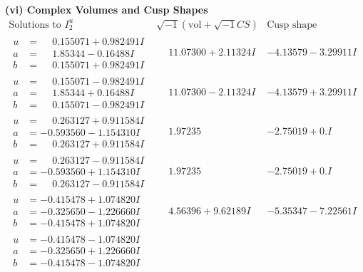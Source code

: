 \documentclass[1p]{elsarticle_modified}
\theoremstyle{definition}
\newcommand{\I}{\sqrt{-1}}
\begin{document}
\newpage\flushleft \textbf{(vi) Complex Volumes and Cusp Shapes}
$$\begin{array}{c|c|c}  
\text{Solutions to }I^u_{2}& \I (\text{vol} + \sqrt{-1}CS) & \text{Cusp shape}\\
 \hline 
\begin{aligned}
u &= \phantom{-}0.155071 + 0.982491 I \\
a &= \phantom{-}1.85344 - 0.16488 I \\
b &= \phantom{-}0.155071 + 0.982491 I\end{aligned}
 & \phantom{-}11.07300 + 2.11324 I & -4.13579 - 3.29911 I \\ \hline\begin{aligned}
u &= \phantom{-}0.155071 - 0.982491 I \\
a &= \phantom{-}1.85344 + 0.16488 I \\
b &= \phantom{-}0.155071 - 0.982491 I\end{aligned}
 & \phantom{-}11.07300 - 2.11324 I & -4.13579 + 3.29911 I \\ \hline\begin{aligned}
u &= \phantom{-}0.263127 + 0.911584 I \\
a &= -0.593560 - 1.154310 I \\
b &= \phantom{-}0.263127 + 0.911584 I\end{aligned}
 & \phantom{-}1.97235\phantom{ +0.000000I} & -2.75019 + 0. I\phantom{ +0.000000I} \\ \hline\begin{aligned}
u &= \phantom{-}0.263127 - 0.911584 I \\
a &= -0.593560 + 1.154310 I \\
b &= \phantom{-}0.263127 - 0.911584 I\end{aligned}
 & \phantom{-}1.97235\phantom{ +0.000000I} & -2.75019 + 0. I\phantom{ +0.000000I} \\ \hline\begin{aligned}
u &= -0.415478 + 1.074820 I \\
a &= -0.325650 - 1.226660 I \\
b &= -0.415478 + 1.074820 I\end{aligned}
 & \phantom{-}4.56396 + 9.62189 I & -5.35347 - 7.22561 I \\ \hline\begin{aligned}
u &= -0.415478 - 1.074820 I \\
a &= -0.325650 + 1.226660 I \\
b &= -0.415478 - 1.074820 I\end{aligned}

\end{array}$$
\end{document}
